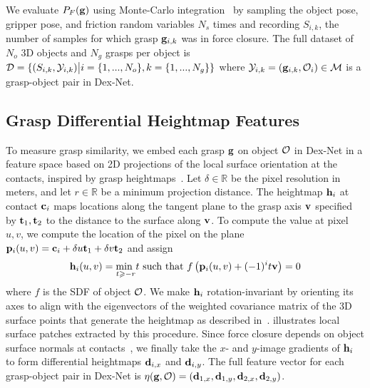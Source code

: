 We evaluate $P_F(\mathbf{g})$ using Monte-Carlo integration~\cite{kehoe2012toward} by sampling the object pose, gripper pose, and friction random variables $N_s$ times and recording $S_{i,k}$, the number of samples for which grasp $\mathbf{g}_{i,k}$ was in force closure.
The full dataset of $N_o$ 3D objects and $N_g$ grasps per object is $\mathcal{D} = \{ (S_{i, k}, \mathcal{Y}_{i, k}) \big| i = \{1, ..., N_o\}, k = \{1, ..., N_g\} \}$ where $\mathcal{Y}_{i,k} = (\mathbf{g}_{i, k}, \mathcal{O}_i) \in \mathcal{M}$ is a grasp-object pair in Dex-Net.



\subsection{Grasp Differential Heightmap Features}
To measure grasp similarity, we embed each grasp $\mathbf{g}$ on object $\mathcal{O}$ in Dex-Net in a feature space based on 2D projections of the local surface orientation at the contacts, inspired by grasp heightmaps~\cite{herzog2014learning, kappler2015leveraging}.
Let $\delta \in \mathbb{R}$ be the pixel resolution in meters, and let $r \in \mathbb{R}$ be a minimum projection distance.
The heightmap $\mathbf{h}_{i}$ at contact $\mathbf{c}_i$ maps locations along the tangent plane to the grasp axis $\mathbf{v}$ specified by $\mathbf{t}_1, \mathbf{t}_2$ to the distance to the surface along $\mathbf{v}$.
To compute the value at pixel $u,v$, we compute the location of the pixel on the plane $\mathbf{p}_i(u,v) = \mathbf{c}_i + \delta u \mathbf{t}_1 + \delta v \mathbf{t}_2$ and assign
\begin{align*}
	\mathbf{h}_i(u,v) = \underset{t \geqslant -r}{\text{min }} t \text{ such that } f\left( \mathbf{p}_i(u,v) + (-1)^{i} t \mathbf{v} \right) = 0
\end{align*}
\noindent where $f$ is the SDF of object $\mathcal{O}$. 
We make $\mathbf{h}_i$ rotation-invariant by orienting its axes to align with the eigenvectors of the weighted covariance matrix of the 3D surface points that generate the heightmap as described in~\cite{salti2014shot}.
 illustrates local surface patches extracted by this procedure.
Since force closure depends on object surface normals at contacts~\cite{pokorny2013c}, we finally take the $x$- and $y$-image gradients of $\mathbf{h}_i$ to form differential heightmaps $\mathbf{d}_{i,x}$ and $\mathbf{d}_{i,y}$.
The full feature vector for each grasp-object pair  in Dex-Net is $\eta(\mathbf{g}, \mathcal{O}) = (\mathbf{d}_{1,x}, \mathbf{d}_{1,y}, \mathbf{d}_{2,x}, \mathbf{d}_{2,y})$.

